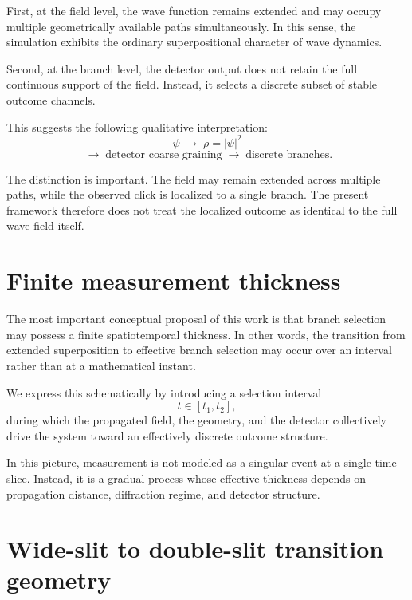 \documentclass[aps,prl,reprint]{revtex4-2}
\begin{document}
First, at the field level, the wave function remains extended and may occupy
multiple geometrically available paths simultaneously. In this sense, the
simulation exhibits the ordinary superpositional character of wave dynamics.

Second, at the branch level, the detector output does not retain the full
continuous support of the field. Instead, it selects a discrete subset of
stable outcome channels.

This suggests the following qualitative interpretation:
\begin{equation*}
\psi \;\longrightarrow\; \rho=|\psi|^2
\end{equation*}
\begin{equation}
\;\longrightarrow\; \text{detector coarse graining}
\;\longrightarrow\; \text{discrete branches}.
\end{equation}

The distinction is important. The field may remain extended across multiple
paths, while the observed click is localized to a single branch. The present
framework therefore does not treat the localized outcome as identical to the
full wave field itself.

\section{Finite measurement thickness}

The most important conceptual proposal of this work is that branch selection
may possess a finite spatiotemporal thickness. In other words, the transition
from extended superposition to effective branch selection may occur over an
interval rather than at a mathematical instant.

We express this schematically by introducing a selection interval
\begin{equation}
t \in [t_1,t_2],
\end{equation}
during which the propagated field, the geometry, and the detector collectively
drive the system toward an effectively discrete outcome structure.

In this picture, measurement is not modeled as a singular event at a single
time slice. Instead, it is a gradual process whose effective thickness depends
on propagation distance, diffraction regime, and detector structure.

\section{Wide-slit to double-slit transition geometry}
\end{document}
